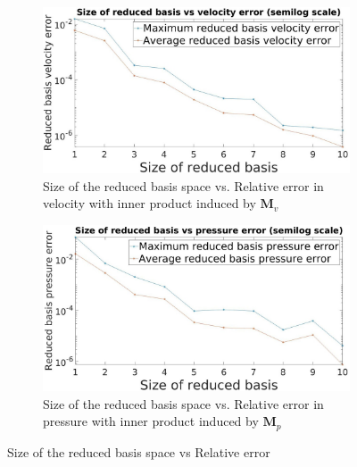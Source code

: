 \documentclass[graybox]{svmult}
\begin{document}
\begin{figure}[H]
\begin{subfigure}{0.48\textwidth}
\includegraphics[width=\linewidth]{size_vs_reduced_basis_velocity_error_semilog.jpg}
\caption{Size of the reduced basis space vs. Relative error in velocity with inner product induced by $\bm{M}_v$} \label{error_vs_basis_velocity}
\end{subfigure}\hspace*{\fill}
\begin{subfigure}{0.48\textwidth}
\includegraphics[width=\linewidth]{size_vs_reduced_basis_pressure_error_semilog.jpg}
\caption{Size of the reduced basis space vs. Relative error in pressure with inner product induced by $\bm{M}_p$} \label{error_vs_basis_pressure}
\end{subfigure}
  \caption{Size of the reduced basis space vs Relative error} 
\label{error_vs_basis}
\end{figure}
\end{document}
